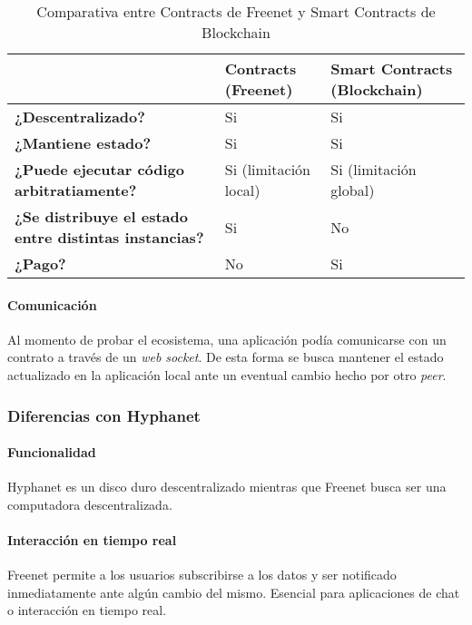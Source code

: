 \setlength\tabcolsep{1pt}
\begin{table}[H]
    \centering
    \begin{tabular}{|m{21em}|m{10em}|m{10em}|}
        \hline
         & \textbf{Contracts (Freenet)} & \textbf{Smart Contracts (Blockchain)} \\
        \hline
        \textbf{¿Descentralizado?} & Si & Si \\
        \hline
        \textbf{¿Mantiene estado?} & Si & Si \\
        \hline
        \textbf{¿Puede ejecutar código arbitratiamente?} & Si (limitación local) & Si (limitación global) \\
        \hline
        \textbf{¿Se distribuye el estado entre distintas instancias?} & Si & No \\
        \hline
        \textbf{¿Pago?} & No & Si \\
        \hline
    \end{tabular}
    \caption{Comparativa entre Contracts de Freenet y Smart Contracts de Blockchain}
    \label{tab:contracts-vs-smart-contracts}
\end{table}

\paragraph{Comunicación}

Al momento de probar el ecosistema, una aplicación podía comunicarse con un contrato a través de un \textit{web socket}. De esta forma se busca mantener el estado actualizado en la aplicación local ante un eventual cambio hecho por otro \textit{peer}.

\subsubsection{Diferencias con Hyphanet}

\paragraph{Funcionalidad} Hyphanet es un disco duro descentralizado mientras que Freenet busca ser una computadora descentralizada.

\paragraph{Interacción en tiempo real} Freenet permite a los usuarios subscribirse a los datos y ser notificado inmediatamente ante algún cambio del mismo. Esencial para aplicaciones de chat o interacción en tiempo real.


